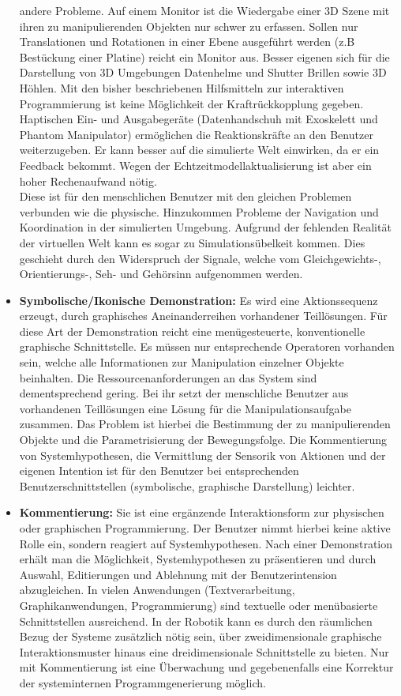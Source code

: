 \begin{itemize}
andere Probleme. Auf einem Monitor ist die Wiedergabe einer 3D Szene mit ihren zu manipulierenden
Objekten nur schwer zu erfassen. Sollen nur Translationen und Rotationen in einer Ebene ausgeführt
werden (z.B Bestückung einer Platine) reicht ein Monitor aus. Besser eigenen sich für die Darstellung
von 3D Umgebungen Datenhelme und Shutter Brillen sowie 3D Höhlen. Mit den
bisher beschriebenen Hilfsmitteln zur interaktiven Programmierung ist keine Möglichkeit
der Kraftrückkopplung gegeben. Haptischen Ein- und
Ausgabegeräte (Datenhandschuh mit Exoskelett und Phantom Manipulator) ermöglichen die Reaktionskräfte
an den Benutzer weiterzugeben. Er kann besser auf die simulierte Welt
einwirken, da er ein Feedback bekommt. Wegen der Echtzeitmodellaktualisierung ist aber
ein hoher Rechenaufwand nötig.\\
Diese ist für den menschlichen Benutzer mit den gleichen
Problemen verbunden wie die physische. Hinzukommen Probleme der Navigation und Koordination
in der simulierten Umgebung. Aufgrund der fehlenden Realität der virtuellen
Welt kann es sogar zu Simulationsübelkeit kommen. Dies geschieht durch den Widerspruch
der Signale, welche vom Gleichgewichts-, Orientierungs-, Seh- und Gehörsinn aufgenommen werden.
\item \textbf{Symbolische/Ikonische Demonstration:}
Es wird eine Aktionssequenz erzeugt, durch graphisches Aneinanderreihen vorhandener Teillösungen. 
Für diese Art der Demonstration reicht eine menügesteuerte, konventionelle graphische Schnittstelle.
Es müssen nur entsprechende Operatoren vorhanden sein, welche alle Informationen zur Manipulation
einzelner Objekte beinhalten. Die Ressourcenanforderungen an das System sind dementsprechend gering.
Bei ihr setzt der menschliche Benutzer aus
vorhandenen Teillösungen eine Lösung für die Manipulationsaufgabe zusammen. Das Problem
ist hierbei die Bestimmung der zu manipulierenden Objekte und die Parametrisierung
der Bewegungsfolge.
Die Kommentierung von Systemhypothesen, die Vermittlung der Sensorik von Aktionen
und der eigenen Intention ist für den Benutzer bei entsprechenden Benutzerschnittstellen
(symbolische, graphische Darstellung) leichter.
\item \textbf{Kommentierung:} Sie ist eine ergänzende Interaktionsform zur physischen oder 
graphischen Programmierung. Der Benutzer nimmt hierbei keine aktive Rolle ein, sondern reagiert
auf Systemhypothesen. Nach einer Demonstration erhält man die Möglichkeit, Systemhypothesen zu
präsentieren und durch Auswahl, Editierungen und Ablehnung mit der
Benutzerintension abzugleichen.
In vielen Anwendungen (Textverarbeitung, Graphikanwendungen, Programmierung) sind
textuelle oder menübasierte Schnittstellen ausreichend. In der Robotik kann es durch den
räumlichen Bezug der Systeme zusätzlich nötig sein, über zweidimensionale graphische
Interaktionsmuster hinaus eine dreidimensionale Schnittstelle zu bieten. Nur mit 
Kommentierung ist eine Überwachung und gegebenenfalls eine Korrektur der systeminternen
Programmgenerierung möglich.
\end{itemize}

